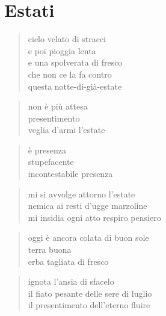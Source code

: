 \chapter*{Estati}


\begin{verse}
    cielo velato di stracci\\
    e poi pioggia lenta\\
    e una spolverata di fresco\\
    che non ce la fa contro\\
    questa notte-di-già-estate
\end{verse}

\clearpage


\begin{verse}
    non è più attesa\\
    presentimento\\
    veglia d'armi l'estate
\end{verse}

\begin{verse}
    è presenza\\
    stupefacente\\
    incontestabile presenza
\end{verse}

\clearpage


\begin{verse}
    mi si avvolge attorno l'estate\\
    nemica ai resti d'ugge marzoline\\
    mi insidia ogni atto respiro pensiero
\end{verse}

\begin{verse}
    oggi è ancora colata di buon sole\\
    terra buona\\
    erba tagliata di fresco
\end{verse}

\begin{verse}
    ignota l'ansia di sfacelo\\
    il fiato pesante delle sere di luglio\\
    il presentimento dell'eterno fluire
\end{verse}

\clearpage


